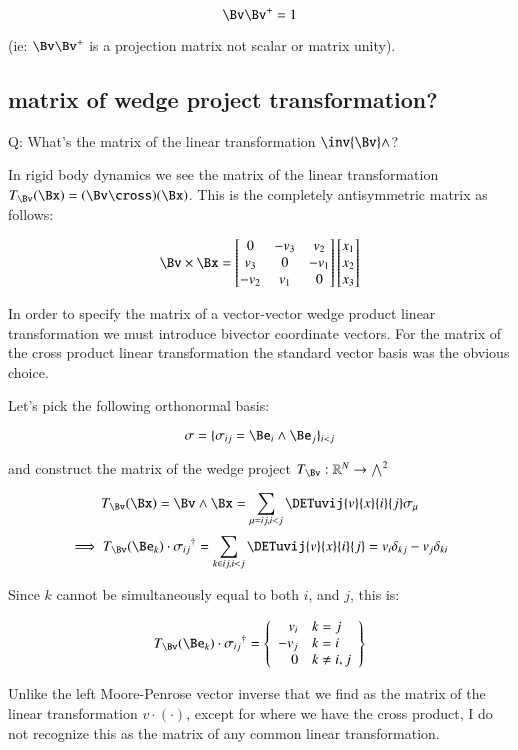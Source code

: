 \[
\Bv \Bv^{+} = 1
\]

(ie: $\Bv \Bv^{+}$ is a projection matrix not scalar or matrix unity).

\subsection{matrix of wedge project transformation? }

Q: What's the matrix of the linear transformation $\inv{\Bv} \wedge$?

In rigid body dynamics we see the matrix of the linear transformation $T_\Bv(\Bx) = (\Bv \cross)(\Bx)$.  This is the completely antisymmetric matrix as follows:

\begin{equation}
\Bv \times \Bx = 
\begin{bmatrix}
0 & -v_3 & v_2 \\
v_3 & 0 & -v_1 \\
-v_2 & v_1 & 0 \\
\end{bmatrix}
\begin{bmatrix}
x_1 \\
x_2 \\
x_3 \\
\end{bmatrix}
\end{equation}

In order to specify the matrix of a vector-vector wedge product linear transformation we must introduce bivector coordinate vectors.  For the matrix of the cross product linear transformation the standard vector basis was the obvious choice.

Let's pick the following orthonormal basis:

\[
\sigma = \{ \sigma_{ij} = \Be_i \wedge \Be_j \}_{i<j}
\]

and construct the matrix of the wedge project $T_\Bv : \mathbb{R}^N \rightarrow {\bigwedge}^2$

\[
T_\Bv(\Bx) = \Bv \wedge \Bx = \sum_{\mu = ij, i<j} \DETuvij{v}{x}{i}{j} \sigma_{\mu}
\]
\[
\implies
T_\Bv(\Be_k) \cdot {\sigma_{ij}}^\dagger = 
\sum_{k \in ij, i<j} \DETuvij{v}{x}{i}{j} 
= %
v_i \delta_{kj} - v_j \delta_{ki}
\]

Since $k$ cannot be simultaneously equal to both $i$, and $j$, this is:

\[
T_\Bv(\Be_k) \cdot {\sigma_{ij}}^\dagger = 
\left\{
\begin{array}{rl}
v_i & k=j \\
-v_j & k=i \\
0 & k \ne i,j \\
\end{array}
\right\}
\]

Unlike the left Moore-Penrose vector inverse that we find as the matrix of the linear transformation $v \cdot ( \cdot )$, except for  where we have the cross product, I do not recognize this as the matrix of any common linear transformation.
